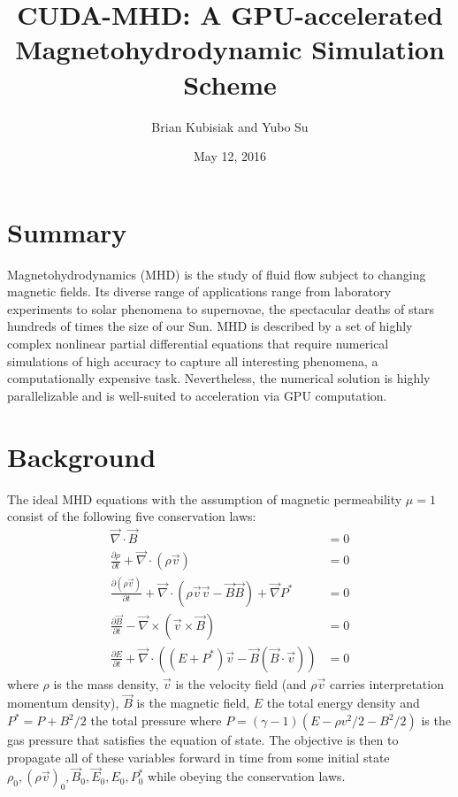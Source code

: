 \documentclass[10pt,twocolumn]{article}
\newcommand{\pd}[2]{\frac{\partial#1}{\partial#2}}
\begin{document}
\pagestyle{fancy}
\cfoot{\thepage/\pageref{LastPage}}

\title{CUDA-MHD\@: A GPU-accelerated Magnetohydrodynamic Simulation Scheme}
\author{Brian Kubisiak and Yubo Su}
\date{May 12, 2016}
\maketitle

\section{Summary}

Magnetohydrodynamics (MHD) is the study of fluid flow subject to changing
magnetic fields. Its diverse range of applications range from laboratory
experiments to solar phenomena to supernovae, the spectacular deaths of stars
hundreds of times the size of our Sun. MHD is described by a set of highly
complex nonlinear partial differential equations that require numerical
simulations of high accuracy to capture all interesting phenomena, a
computationally expensive task. Nevertheless, the numerical solution is highly
parallelizable and is well-suited to acceleration via GPU computation.

\section{Background}

The ideal MHD equations with the assumption of magnetic permeability $\mu = 1$
consist of the following five conservation laws:
\begin{align}
    \vec{\nabla} \cdot \vec{B} &= 0 \\
    \pd{\rho}{t} + \vec{\nabla} \cdot \left( \rho \vec{v} \right) &= 0 \\
    \pd{(\rho \vec{v})}{t} + \vec{\nabla} \cdot \left( \rho \vec{v}\vec{v} -
    \vec{B} \vec{B} \right) + \vec{\nabla}P^* &= 0 \\
    \pd{\vec{B}}{t} - \vec{\nabla} \times \left( \vec{v} \times \vec{B} \right)
    &= 0 \\
    \pd{E}{t} + \vec{\nabla} \cdot \left( (E + P^*)\vec{v} - \vec{B}\left(
    \vec{B} \cdot \vec{v} \right) \right) &= 0
\end{align}
where $\rho$ is the mass density, $\vec{v}$ is the velocity field (and $\rho
\vec{v}$ carries interpretation momentum density), $\vec{B}$ is the magnetic
field, $E$ the total energy density and $P^* = P + {B^2}/{2}$ the total
pressure where $P = (\gamma - 1)\left( E - \rho {v^2} / {2} - {B^2} / {2}
\right)$ is the gas pressure that satisfies the equation of state. The objective
is then to propagate all of these variables forward in time from some initial
state $\rho_0, {(\rho \vec{v})}_0, \vec{B}_0, \vec{E}_0, E_0, P^*_0$ while
obeying the conservation laws.
\end{document}
